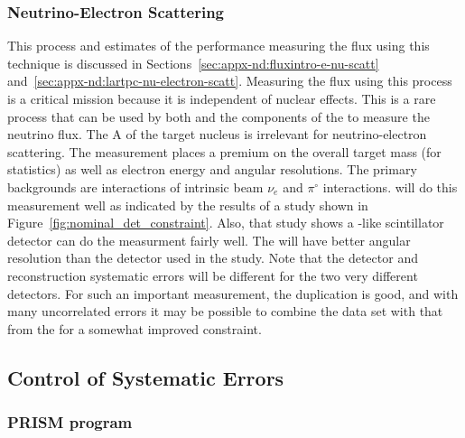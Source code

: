 \subsubsection{Neutrino-Electron Scattering}
This process and estimates of the   performance measuring the flux using this technique is discussed in Sections~\ref{sec:appx-nd:fluxintro-e-nu-scatt} and~\ref{sec:appx-nd:lartpc-nu-electron-scatt}.  Measuring the flux using this process is a critical  mission because it is independent of nuclear effects.  This is a rare process that can be used by both  and the  components of the  to measure the neutrino flux.  The A of the target nucleus is irrelevant for neutrino-electron scattering.  The measurement places a premium on the overall target mass (for statistics) as well as electron energy and angular resolutions.  The primary backgrounds are  interactions of intrinsic beam $\nu_{e}$ and $\pi^{\circ}$ interactions.   will do this measurement well as indicated by the results of a study shown in Figure~\ref{fig:nominal_det_constraint}.  Also, that study shows a -like scintillator detector can do the measurment fairly well.  The  will have better angular resolution than the detector used in the study. Note that the detector and reconstruction systematic errors will be different for the two very different detectors.  For such an important measurement, the duplication is good, and with many uncorrelated errors it may be possible to combine the  data set with that from the  for a somewhat improved constraint. 


\subsection{Control of Systematic Errors}


\subsubsection{PRISM program}

